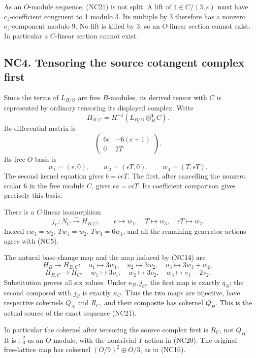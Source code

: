 \documentclass[
  10pt,
]{article}
\begin{document}
As an \(O\)-module sequence, (NC21) is not split. A lift of
\(1\in C/(3,\epsilon)\) must have \(c_1\)-coefficient congruent to 1
modulo 3. Its multiple by 3 therefore has a nonzero \(c_1\)-component
modulo 9. No lift is killed by 3, so an \(O\)-linear section cannot
exist. In particular a \(C\)-linear section cannot exist.

\subsection{NC4. Tensoring the source cotangent complex
first}\label{nc4.-tensoring-the-source-cotangent-complex-first}

Since the terms of \(L_{B/O}\) are free \(B\)-modules, its derived
tensor with \(C\) is represented by ordinary tensoring its displayed
complex. Write \[
H_{B,C}=H^{-1}(L_{B/O}\otimes_B^{\mathbf L}C).
\] Its differential matrix is \[
\begin{pmatrix}6\epsilon&-6(\epsilon+1)\\0&2T\end{pmatrix}.
\] Its free \(O\)-basis is \[
w_1=(\epsilon,0),\qquad
w_2=(\epsilon T,0),\qquad
w_3=(T,\epsilon T).
\tag{NC23}
\] The second kernel equation gives \(b=c\epsilon T\). The first, after
cancelling the nonzero scalar 6 in the free module \(C\), gives
\(\epsilon a=c\epsilon T\). Its coefficient comparison gives precisely
this basis.

There is a \(C\)-linear isomorphism \[
j_C:N_C\xrightarrow{\sim}H_{B,C},\qquad
\epsilon\mapsto w_1,\quad T\mapsto w_3,\quad\epsilon T\mapsto w_2.
\tag{NC24}
\] Indeed \(\epsilon w_3=w_2\), \(Tw_1=w_2\), \(Tw_3=6w_1\), and all the
remaining generator actions agree with (NC5).

The natural base-change map and the map induced by (NC14) are \[
H_B\longrightarrow H_{B,C}:\quad
u_1\mapsto3w_1,\quad u_2\mapsto3w_2,\quad u_3\mapsto3w_3+w_2,
\] \[
H_{B,C}\longrightarrow H_C:\quad
w_1\mapsto3v_1,\quad w_2\mapsto3v_2,\quad w_3\mapsto v_3-2v_2.
\tag{NC25}
\] Substitution proves all six values. Under \(\kappa_B,j_C\), the first
map is exactly \(q_N\); the second composed with \(j_C\) is exactly
\(\kappa_C\). Thus the two maps are injective, have respective cokernels
\(Q_N\) and \(R_C\), and their composite has cokernel \(Q_H\). This is
the actual source of the exact sequence (NC21).

In particular the cokernel after tensoring the source complex first is
\(R_C\), not \(Q_H\). It is \(\mathbb F_3^2\) as an \(O\)-module, with
the nontrivial \(T\)-action in (NC20). The original free-lattice map has
cokernel \((O/9)^2\oplus O/3\), as in (NC16).
\end{document}
